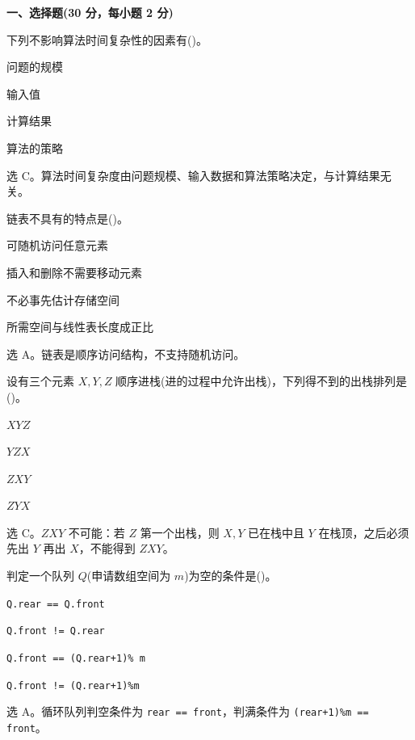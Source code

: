 \textbf{一、选择题(30 分，每小题 2 分)}

\begin{question}
下列不影响算法时间复杂性的因素有(\quad)。
\begin{choiceoptions}[2]
  \item 问题的规模
  \item 输入值
  \item 计算结果
  \item 算法的策略
\end{choiceoptions}
\begin{solution}
选 C。算法时间复杂度由问题规模、输入数据和算法策略决定，与计算结果无关。
\end{solution}
\end{question}

\begin{question}
链表不具有的特点是(\quad)。
\begin{choiceoptions}[2]
  \item 可随机访问任意元素
  \item 插入和删除不需要移动元素
  \item 不必事先估计存储空间
  \item 所需空间与线性表长度成正比
\end{choiceoptions}
\begin{solution}
选 A。链表是顺序访问结构，不支持随机访问。
\end{solution}
\end{question}

\begin{question}
设有三个元素 $X,Y,Z$ 顺序进栈(进的过程中允许出栈)，下列得不到的出栈排列是(\quad)。
\begin{choiceoptions}[2]
  \item $XYZ$
  \item $YZX$
  \item $ZXY$
  \item $ZYX$
\end{choiceoptions}
\begin{solution}
选 C。$ZXY$ 不可能：若 $Z$ 第一个出栈，则 $X,Y$ 已在栈中且 $Y$ 在栈顶，之后必须先出 $Y$ 再出 $X$，不能得到 $ZXY$。
\end{solution}
\end{question}

\begin{question}
判定一个队列 $Q$(申请数组空间为 $m$)为空的条件是(\quad)。
\begin{choiceoptions}[1]
  \item \texttt{Q.rear == Q.front}
  \item \texttt{Q.front != Q.rear}
  \item \texttt{Q.front == (Q.rear+1)\% m}
  \item \texttt{Q.front != (Q.rear+1)\%m}
\end{choiceoptions}
\begin{solution}
选 A。循环队列判空条件为 \texttt{rear == front}，判满条件为 \texttt{(rear+1)\%m == front}。
\end{solution}
\end{question}

